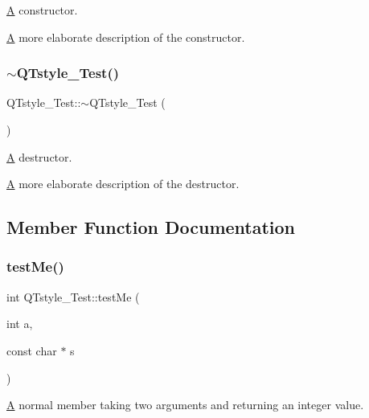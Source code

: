 \mbox{\hyperlink{class_a}{A}} constructor. 

\mbox{\hyperlink{class_a}{A}} more elaborate description of the constructor. \mbox{\label{class_q_tstyle___test_a7e82397d534d9a867f0857da01a46e9e}} 
\subsubsection{\texorpdfstring{$\sim$QTstyle\_Test()}{~QTstyle\_Test()}}
{\footnotesize\ttfamily Q\+Tstyle\+\_\+\+Test\+::$\sim$\+Q\+Tstyle\+\_\+\+Test (\begin{DoxyParamCaption}{ }\end{DoxyParamCaption})}



\mbox{\hyperlink{class_a}{A}} destructor. 

\mbox{\hyperlink{class_a}{A}} more elaborate description of the destructor. 

\subsection{Member Function Documentation}
\mbox{\label{class_q_tstyle___test_a8840748753118dd468e8368a28e49c62}} 
\subsubsection{\texorpdfstring{testMe()}{testMe()}}
{\footnotesize\ttfamily int Q\+Tstyle\+\_\+\+Test\+::test\+Me (\begin{DoxyParamCaption}\item[{int}]{a,  }\item[{const char $\ast$}]{s }\end{DoxyParamCaption})}



\mbox{\hyperlink{class_a}{A}} normal member taking two arguments and returning an integer value. 


